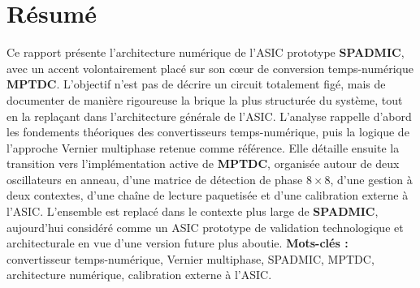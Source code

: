 \chapter*{Résumé}
\noindent
Ce rapport présente l'architecture numérique de l'ASIC prototype \textbf{SPADMIC}, avec un accent volontairement placé sur son cœur de conversion temps-numérique \textbf{MPTDC}. L'objectif n'est pas de décrire un circuit totalement figé, mais de documenter de manière rigoureuse la brique la plus structurée du système, tout en la replaçant dans l'architecture générale de l'ASIC. L'analyse rappelle d'abord les fondements théoriques des convertisseurs temps-numérique, puis la logique de l'approche Vernier multiphase retenue comme référence. Elle détaille ensuite la transition vers l'implémentation active de \textbf{MPTDC}, organisée autour de deux oscillateurs en anneau, d'une matrice de détection de phase $8 \times 8$, d'une gestion à deux contextes, d'une chaîne de lecture paquetisée et d'une calibration externe à l'ASIC. L'ensemble est replacé dans le contexte plus large de \textbf{SPADMIC}, aujourd'hui considéré comme un ASIC prototype de validation technologique et architecturale en vue d'une version future plus aboutie.
\newline
\textbf{Mots-clés :} convertisseur temps-numérique, Vernier multiphase, SPADMIC, MPTDC, architecture numérique, calibration externe à l'ASIC.
